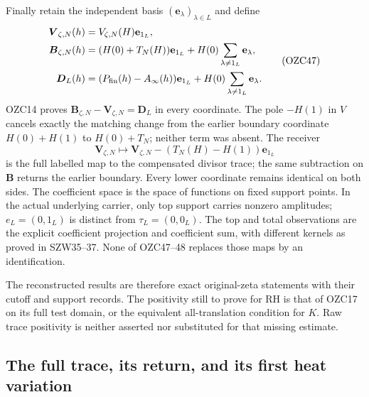 \documentclass[
  10pt,
  a4paper,
]{article}
\begin{document}
Finally retain the independent basis
\((\mathbf e_\lambda)_{\lambda\in L}\) and define \[
\begin{aligned}
\boldsymbol V_{\zeta,N}(h)&=V_{\zeta,N}(H)\mathbf e_{1_L},\\
\boldsymbol B_{\zeta,N}(h)&=(H(0)+T_N(H))\mathbf e_{1_L}
+H(0)\sum_{\lambda\ne1_L}\mathbf e_\lambda,\\
\boldsymbol D_L(h)&=(P_{\rm fin}(h)-A_\infty(h))\mathbf e_{1_L}
+H(0)\sum_{\lambda\ne1_L}\mathbf e_\lambda.
\end{aligned}
\tag{OZC47}
\] OZC14 proves
\(\boldsymbol B_{\zeta,N}-\boldsymbol V_{\zeta,N}=\boldsymbol D_L\) in
every coordinate. The pole \(-H(1)\) in \(V\) cancels exactly the
matching change from the earlier boundary coordinate \(H(0)+H(1)\) to
\(H(0)+T_N\); neither term was absent. The receiver \[
\boldsymbol V_{\zeta,N}\longmapsto
\boldsymbol V_{\zeta,N}-(T_N(H)-H(1))\mathbf e_{1_L}
\tag{OZC48}
\] is the full labelled map to the compensated divisor trace; the same
subtraction on \(\boldsymbol B\) returns the earlier boundary. Every
lower coordinate remains identical on both sides. The coefficient space
is the space of functions on fixed support points. In the actual
underlying carrier, only top support carries nonzero amplitudes;
\(e_L=(0,1_L)\) is distinct from \(\tau_L=(0,0_L)\). The top and total
observations are the explicit coefficient projection and coefficient
sum, with different kernels as proved in SZW35--37. None of OZC47--48
replaces those maps by an identification.

The reconstructed results are therefore exact original-zeta statements
with their cutoff and support records. The positivity still to prove for
RH is that of OZC17 on its full test domain, or the equivalent
all-translation condition for \(K\). Raw trace positivity is neither
asserted nor substituted for that missing estimate.

\subsection{The full trace, its return, and its first heat
variation}\label{the-full-trace-its-return-and-its-first-heat-variation}
\end{document}
